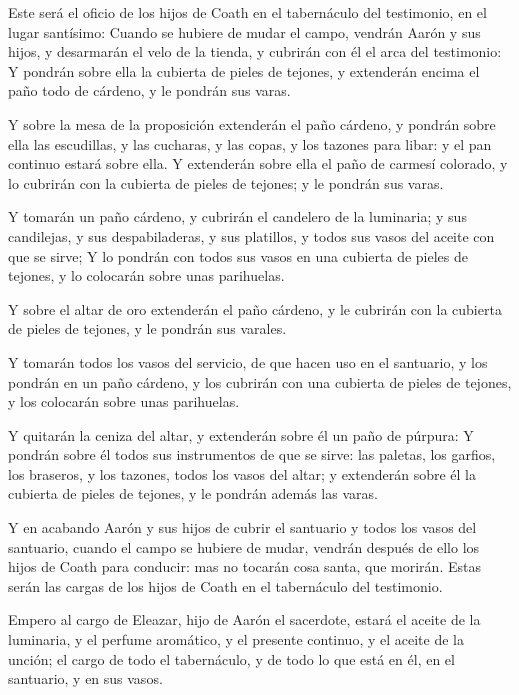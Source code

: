  Este será el oficio de los hijos de Coath en el tabernáculo
del testimonio, en el lugar santísimo:  Cuando se hubiere de
mudar el campo, vendrán Aarón y sus hijos, y desarmarán el velo de la
tienda, y cubrirán con él el arca del testimonio:  Y pondrán
sobre ella la cubierta de pieles de tejones, y extenderán encima el paño
todo de cárdeno, y le pondrán sus varas.

 Y sobre la mesa de la proposición extenderán el paño
cárdeno, y pondrán sobre ella las escudillas, y las cucharas, y las
copas, y los tazones para libar: y el pan continuo estará sobre ella.
 Y extenderán sobre ella el paño de carmesí colorado, y lo
cubrirán con la cubierta de pieles de tejones; y le pondrán sus varas.

 Y tomarán un paño cárdeno, y cubrirán el candelero de la
luminaria; y sus candilejas, y sus despabiladeras, y sus platillos, y
todos sus vasos del aceite con que se sirve;  Y lo pondrán
con todos sus vasos en una cubierta de pieles de tejones, y lo colocarán
sobre unas parihuelas.

 Y sobre el altar de oro extenderán el paño cárdeno, y le
cubrirán con la cubierta de pieles de tejones, y le pondrán sus varales.

 Y tomarán todos los vasos del servicio, de que hacen uso
en el santuario, y los pondrán en un paño cárdeno, y los cubrirán con
una cubierta de pieles de tejones, y los colocarán sobre unas
parihuelas.

 Y quitarán la ceniza del altar, y extenderán sobre él un
paño de púrpura:  Y pondrán sobre él todos sus instrumentos
de que se sirve: las paletas, los garfios, los braseros, y los tazones,
todos los vasos del altar; y extenderán sobre él la cubierta de pieles
de tejones, y le pondrán además las varas.

 Y en acabando Aarón y sus hijos de cubrir el santuario y
todos los vasos del santuario, cuando el campo se hubiere de mudar,
vendrán después de ello los hijos de Coath para conducir: mas no tocarán
cosa santa, que morirán. Estas serán las cargas de los hijos de Coath en
el tabernáculo del testimonio.

 Empero al cargo de Eleazar, hijo de Aarón el sacerdote,
estará el aceite de la luminaria, y el perfume aromático, y el presente
continuo, y el aceite de la unción; el cargo de todo el tabernáculo, y
de todo lo que está en él, en el santuario, y en sus vasos.

